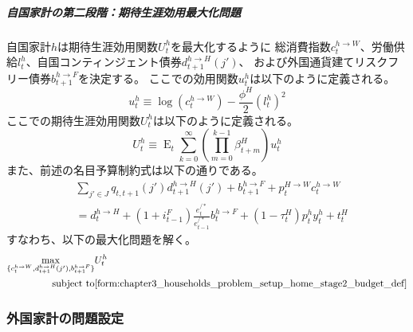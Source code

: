 \subparagraph{自国家計の第二段階：期待生涯効用最大化問題}
\label{sec:chapter3_households_problem_setup_home_stage2}
自国家計\(h\)は期待生涯効用関数\(U_t^h\)を最大化するように
総消費指数\(c_t^{h\to W}\)、労働供給\(l_t^h\)、自国コンティンジェント債券\(d_{t+1}^{h\to H}(j')\)、
および外国通貨建てリスクフリー債券\(b_{t+1}^{h\to F}\)を決定する。
ここでの効用関数\(u_t^h\)は以下のように定義される。
\begin{equation}
\label{form:chapter3_households_problem_setup_home_stage2_u_h_def}
    u_t^h\equiv\log(c_t^{h\to W})-\frac{\phi^H}{2}(l_t^h)^2
\end{equation}
ここでの期待生涯効用関数\(U_t^h\)は以下のように定義される。
\begin{equation}
\label{form:chapter3_households_problem_setup_home_stage2_U_h_def}
    U_t^h\equiv\operatorname{E}_t\sum_{k=0}^{\infty}\left(\prod_{m=0}^{k-1}\beta_{t+m}^H\right)u_t^h
\end{equation}
また、前述の名目予算制約式は以下の通りである。
\begin{equation}
\label{form:chapter3_households_problem_setup_home_stage2_budget_def}
    \begin{split}
        &\sum_{j'\in J}q_{t,t+1}(j')d_{t+1}^{h\to H}(j')+b_{t+1}^{h\to F}+p_t^{H\to W}c_t^{h\to W}\\
        &=d_t^{h\to H}+(1+i_{t-1}^F)\frac{e_t^{/*}}{e_{t-1}^{/*}}b_t^{h\to F}+(1-\tau_t^H)p_t^hy_t^h+t_t^H
    \end{split}
\end{equation}
すなわち、以下の最大化問題を解く。
\begin{equation}
\label{form:chapter3_households_problem_setup_home_stage2_max_def}
    \begin{aligned}
        \max_{\{c_t^{h\to W},d_{t+1}^{h\to H}(j'),b_{t+1}^{h\to F}\}}
        &U_t^h\\
        \text{subject to}
        &\eqref{form:chapter3_households_problem_setup_home_stage2_budget_def}
    \end{aligned}
\end{equation}

\subsubsection{外国家計の問題設定}
\label{sec:chapter3_households_problem_setup_foreign}


